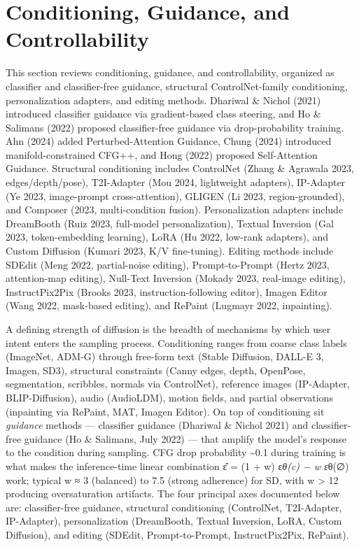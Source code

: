 \section{Conditioning, Guidance, and Controllability}\label{conditioning-guidance-and-controllability}

This section reviews conditioning, guidance, and controllability, organized as classifier and classifier-free guidance, structural ControlNet-family conditioning, personalization adapters, and editing methods. Dhariwal \& Nichol (2021) introduced classifier guidance via gradient-based class steering, and Ho \& Salimans (2022) proposed classifier-free guidance via drop-probability training. Ahn (2024) added Perturbed-Attention Guidance, Chung (2024) introduced manifold-constrained CFG++, and Hong (2022) proposed Self-Attention Guidance. Structural conditioning includes ControlNet (Zhang \& Agrawala 2023, edges/depth/pose), T2I-Adapter (Mou 2024, lightweight adapters), IP-Adapter (Ye 2023, image-prompt cross-attention), GLIGEN (Li 2023, region-grounded), and Composer (2023, multi-condition fusion). Personalization adapters include DreamBooth (Ruiz 2023, full-model personalization), Textual Inversion (Gal 2023, token-embedding learning), LoRA (Hu 2022, low-rank adapters), and Custom Diffusion (Kumari 2023, K/V fine-tuning). Editing methods include SDEdit (Meng 2022, partial-noise editing), Prompt-to-Prompt (Hertz 2023, attention-map editing), Null-Text Inversion (Mokady 2023, real-image editing), InstructPix2Pix (Brooks 2023, instruction-following editor), Imagen Editor (Wang 2022, mask-based editing), and RePaint (Lugmayr 2022, inpainting).

A defining strength of diffusion is the breadth of mechanisms by which user intent enters the sampling process. Conditioning ranges from coarse class labels (ImageNet, ADM-G) through free-form text (Stable Diffusion, DALL-E 3, Imagen, SD3), structural constraints (Canny edges, depth, OpenPose, segmentation, scribbles, normals via ControlNet), reference images (IP-Adapter, BLIP-Diffusion), audio (AudioLDM), motion fields, and partial observations (inpainting via RePaint, MAT, Imagen Editor). On top of conditioning sit \emph{guidance} methods --- classifier guidance (Dhariwal \& Nichol 2021) and classifier-free guidance (Ho \& Salimans, July 2022) --- that amplify the model's response to the condition during sampling. CFG drop probability \textasciitilde0.1 during training is what makes the inference-time linear combination ε̂ = (1 + w) ε\emph{θ(c) − w ε}θ(∅) work; typical w ≈ 3 (balanced) to 7.5 (strong adherence) for SD, with w \textgreater{} 12 producing oversaturation artifacts. The four principal axes documented below are: classifier-free guidance, structural conditioning (ControlNet, T2I-Adapter, IP-Adapter), personalization (DreamBooth, Textual Inversion, LoRA, Custom Diffusion), and editing (SDEdit, Prompt-to-Prompt, InstructPix2Pix, RePaint).

